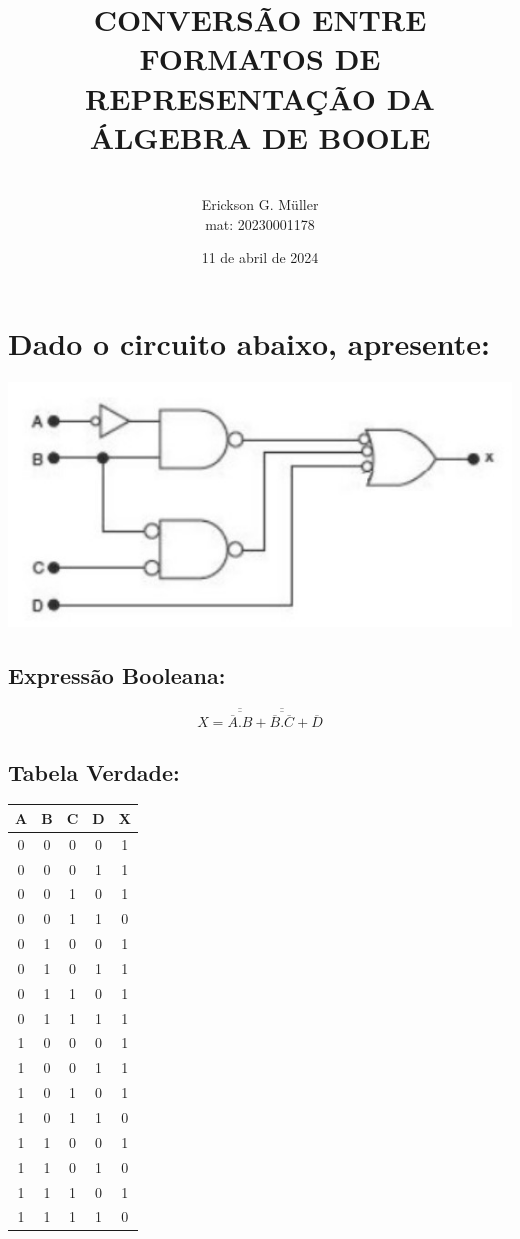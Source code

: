 \documentclass{article}
\title{CONVERSÃO ENTRE FORMATOS DE REPRESENTAÇÃO DA ÁLGEBRA DE BOOLE}
\author{\\Erickson G. Müller\\mat: 20230001178}
\date{11 de abril de 2024}
\begin{document}
	\maketitle
	\vspace*{4cm}
	\section{Dado o circuito abaixo, apresente:}
		\hspace{1 cm}
		\includegraphics[scale=0.9]{Images/Circuito A.jpg}
		\pagebreak
		\subsection{Expressão Booleana:}
		\begin{equation*}
			X = \overline{\overline{\overline{A}.B}} +\overline{\overline{\overline{B}.\overline{C}}}+\overline{D}
		\end{equation*}
		
		\subsection{Tabela Verdade:}
		\hspace*{5 cm}
			\begin{tabular}{|c|c|c|c|c|}
			\hline
			\textbf{ A } & \textbf{ B } & \textbf{ C } & \textbf{ D } & \textbf{ X } \\
			\hline
			0 & 0 & 0 & 0 & 1 \\
			\hline
			0 & 0 & 0 & 1 & 1 \\
			\hline
			0 & 0 & 1 & 0 & 1 \\
			\hline
			0 & 0 & 1 & 1 & 0 \\
			\hline
			0 & 1 & 0 & 0 & 1 \\
			\hline
			0 & 1 & 0 & 1 & 1 \\
			\hline
			0 & 1 & 1 & 0 & 1 \\
			\hline
			0 & 1 & 1 & 1 & 1 \\
			\hline
			1 & 0 & 0 & 0 & 1 \\
			\hline
			1 & 0 & 0 & 1 & 1 \\
			\hline
			1 & 0 & 1 & 0 & 1 \\
			\hline
			1 & 0 & 1 & 1 & 0 \\
			\hline
			1 & 1 & 0 & 0 & 1 \\
			\hline
			1 & 1 & 0 & 1 & 0 \\
			\hline
			1 & 1 & 1 & 0 & 1 \\
			\hline
			1 & 1 & 1 & 1 & 0 \\
			\hline
			\end{tabular}
\end{document}

